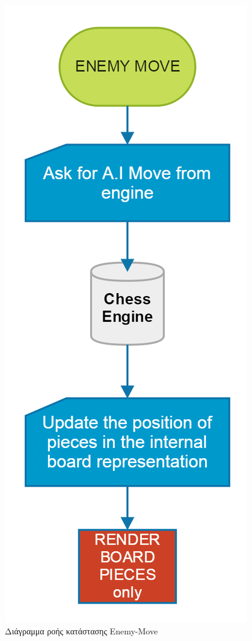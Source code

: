 \begin{figure}[H]
    \centering
    \includegraphics[scale=0.3]{Files/Figures/enemy_move.png}
    \caption[Διάγραμμα ροής κατάστασης Enemy-Move]{Διάγραμμα ροής κατάστασης Enemy-Move}
    \label{fig:enemy_move}
\end{figure}


